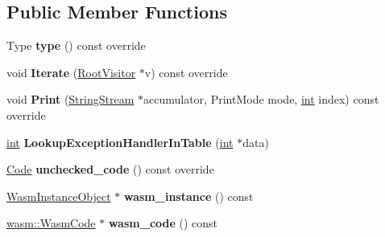 \subsection*{Public Member Functions}
\begin{DoxyCompactItemize}
\item 
\mbox{\label{classv8_1_1internal_1_1WasmCompiledFrame_a42c88c2ae0582e8d4cb1ff312caeaec1}} 
Type {\bfseries type} () const override
\item 
\mbox{\label{classv8_1_1internal_1_1WasmCompiledFrame_a55677ae8e979b41b4dc90b480a4bde65}} 
void {\bfseries Iterate} (\mbox{\hyperlink{classv8_1_1internal_1_1RootVisitor}{Root\+Visitor}} $\ast$v) const override
\item 
\mbox{\label{classv8_1_1internal_1_1WasmCompiledFrame_a9c85600d6d1841aab18b84b84ee1b76c}} 
void {\bfseries Print} (\mbox{\hyperlink{classv8_1_1internal_1_1StringStream}{String\+Stream}} $\ast$accumulator, Print\+Mode mode, \mbox{\hyperlink{classint}{int}} index) const override
\item 
\mbox{\label{classv8_1_1internal_1_1WasmCompiledFrame_aabfc66cfe9e84bacb698628178b1329f}} 
\mbox{\hyperlink{classint}{int}} {\bfseries Lookup\+Exception\+Handler\+In\+Table} (\mbox{\hyperlink{classint}{int}} $\ast$data)
\item 
\mbox{\label{classv8_1_1internal_1_1WasmCompiledFrame_afbef067d71674e8bf1ce7d4bb76e2675}} 
\mbox{\hyperlink{classv8_1_1internal_1_1Code}{Code}} {\bfseries unchecked\+\_\+code} () const override
\item 
\mbox{\label{classv8_1_1internal_1_1WasmCompiledFrame_aea70d6c0e45c22357640c0262c803a19}} 
\mbox{\hyperlink{classv8_1_1internal_1_1WasmInstanceObject}{Wasm\+Instance\+Object}} $\ast$ {\bfseries wasm\+\_\+instance} () const
\item 
\mbox{\label{classv8_1_1internal_1_1WasmCompiledFrame_a7e5c5180ac3e7e04fd046ea038c9958a}} 
\mbox{\hyperlink{classv8_1_1internal_1_1wasm_1_1WasmCode}{wasm\+::\+Wasm\+Code}} $\ast$ {\bfseries wasm\+\_\+code} () const

\end{DoxyCompactItemize}
